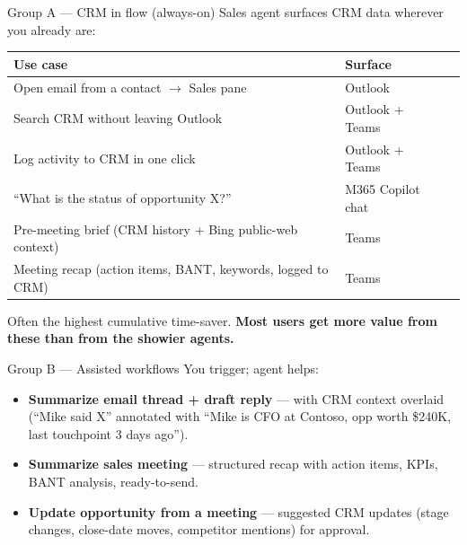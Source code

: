 \documentclass[11pt,aspectratio=169]{beamer}
\newcommand{\hl}[1]{\textbf{\textcolor{accentteal}{#1}}}
\begin{document}
\begin{frame}{Group A --- CRM in flow (always-on)}
  Sales agent surfaces CRM data wherever you already are:

  \medskip
  \centering\footnotesize
  \begin{tabular}{p{}ll}
    \toprule
    \textbf{Use case} & \textbf{Surface} \\
    \midrule
    Open email from a contact $\rightarrow$ Sales pane              & Outlook \\
    Search CRM without leaving Outlook                              & Outlook + Teams \\
    Log activity to CRM in one click                                & Outlook + Teams \\
    ``What is the status of opportunity X?''                        & M365 Copilot chat \\
    Pre-meeting brief (CRM history + Bing public-web context)       & Teams \\
    Meeting recap (action items, BANT, keywords, logged to CRM)     & Teams \\
    \bottomrule
  \end{tabular}

  \vfill
  \raggedright \small Often the highest cumulative time-saver. \hl{Most users get more value from these than from the showier agents.}
\end{frame}

\begin{frame}{Group B --- Assisted workflows}
  You trigger; agent helps:

  \medskip
  \begin{itemize}
    \item \textbf{Summarize email thread + draft reply} --- with CRM context overlaid (``Mike said X'' annotated with ``Mike is CFO at Contoso, opp worth \$240K, last touchpoint 3 days ago'').
    \item \textbf{Summarize sales meeting} --- structured recap with action items, KPIs, BANT analysis, ready-to-send.
    \item \textbf{Update opportunity from a meeting} --- suggested CRM updates (stage changes, close-date moves, competitor mentions) for approval.
  \end{itemize}
\end{frame}
\end{document}
